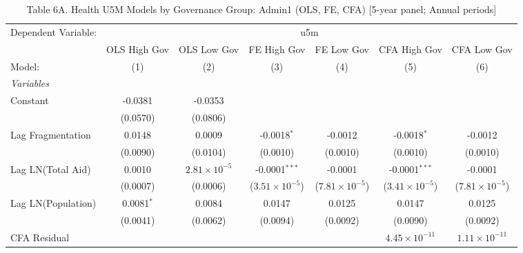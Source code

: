 
\begin{table}[H]
   \caption{Table 6A. Health U5M Models by Governance Group: Admin1 (OLS, FE, CFA) [5-year panel; Annual periods]}
   \centering
   \begin{tabular}{lcccccc}
      \tabularnewline \midrule \midrule
      Dependent Variable: & \multicolumn{6}{c}{u5m}\\
                         & OLS High Gov & OLS Low Gov           & FE High Gov             & FE Low Gov              & CFA High Gov             & CFA Low Gov \\   
      Model:             & (1)          & (2)                   & (3)                     & (4)                     & (5)                      & (6)\\  
      \midrule
      \emph{Variables}\\
      Constant           & -0.0381      & -0.0353               &                         &                         &                          &   \\   
                         & (0.0570)     & (0.0806)              &                         &                         &                          &   \\   
      Lag Fragmentation  & 0.0148       & 0.0009                & -0.0018$^{*}$           & -0.0012                 & -0.0018$^{*}$            & -0.0012\\   
                         & (0.0090)     & (0.0104)              & (0.0010)                & (0.0010)                & (0.0010)                 & (0.0010)\\   
      Lag LN(Total Aid)  & 0.0010       & $2.81\times 10^{-5}$  & -0.0001$^{***}$         & -0.0001                 & -0.0001$^{***}$          & -0.0001\\   
                         & (0.0007)     & (0.0006)              & ($3.51\times 10^{-5}$)  & ($7.81\times 10^{-5}$)  & ($3.41\times 10^{-5}$)   & ($7.81\times 10^{-5}$)\\    
      Lag LN(Population) & 0.0081$^{*}$ & 0.0084                & 0.0147                  & 0.0125                  & 0.0147                   & 0.0125\\   
                         & (0.0041)     & (0.0062)              & (0.0094)                & (0.0092)                & (0.0090)                 & (0.0092)\\   
      CFA Residual       &              &                       &                         &                         & $4.45\times 10^{-11}$    & $1.11\times 10^{-11}$\\    

\end{tabular}
\end{table}
